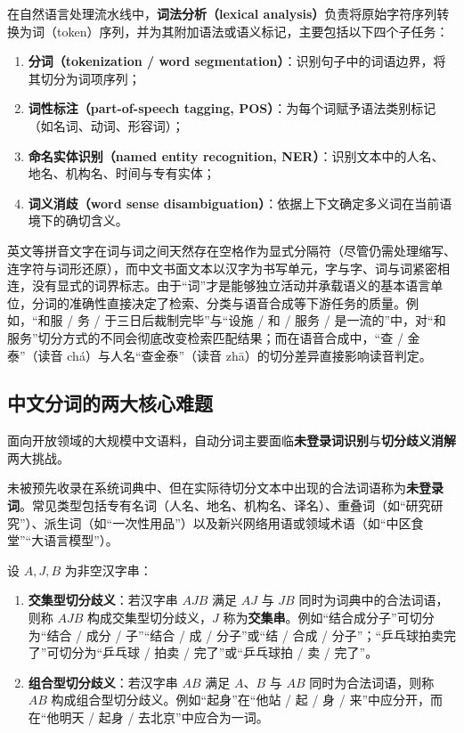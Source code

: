 在自然语言处理流水线中，\textbf{词法分析（lexical analysis）}负责将原始字符序列转换为词（token）序列，并为其附加语法或语义标记，主要包括以下四个子任务：
\begin{enumerate}
  \item \textbf{分词（tokenization / word segmentation）}：识别句子中的词语边界，将其切分为词项序列；
  \item \textbf{词性标注（part-of-speech tagging, POS）}：为每个词赋予语法类别标记（如名词、动词、形容词）；
  \item \textbf{命名实体识别（named entity recognition, NER）}：识别文本中的人名、地名、机构名、时间与专有实体；
  \item \textbf{词义消歧（word sense disambiguation）}：依据上下文确定多义词在当前语境下的确切含义。
\end{enumerate}

英文等拼音文字在词与词之间天然存在空格作为显式分隔符（尽管仍需处理缩写、连字符与词形还原），而中文书面文本以汉字为书写单元，字与字、词与词紧密相连，没有显式的词界标志。由于“词”才是能够独立活动并承载语义的基本语言单位，分词的准确性直接决定了检索、分类与语音合成等下游任务的质量。例如，“和服 / 务 / 于三日后裁制完毕”与“设施 / 和 / 服务 / 是一流的”中，对“和服务”切分方式的不同会彻底改变检索匹配结果；而在语音合成中，“查 / 金泰”（读音 chá）与人名“查金泰”（读音 zhā）的切分差异直接影响读音判定。

\subsection{中文分词的两大核心难题}

面向开放领域的大规模中文语料，自动分词主要面临\textbf{未登录词识别}与\textbf{切分歧义消解}两大挑战。

\begin{definition}\label{def:oov}
未被预先收录在系统词典中、但在实际待切分文本中出现的合法词语称为\textbf{未登录词}。常见类型包括专有名词（人名、地名、机构名、译名）、重叠词（如“研究研究”）、派生词（如“一次性用品”）以及新兴网络用语或领域术语（如“中区食堂”“大语言模型”）。
\end{definition}

\begin{definition}[交集型与组合型切分歧义]\label{def:seg-ambiguity}
设 $A, J, B$ 为非空汉字串：
\begin{enumerate}
  \item \textbf{交集型切分歧义}：若汉字串 $AJB$ 满足 $AJ$ 与 $JB$ 同时为词典中的合法词语，则称 $AJB$ 构成交集型切分歧义，$J$ 称为\textbf{交集串}。例如“结合成分子”可切分为“结合 / 成分 / 子”“结合 / 成 / 分子”或“结 / 合成 / 分子”；“乒乓球拍卖完了”可切分为“乒乓球 / 拍卖 / 完了”或“乒乓球拍 / 卖 / 完了”。
  \item \textbf{组合型切分歧义}：若汉字串 $AB$ 满足 $A$、$B$ 与 $AB$ 同时为合法词语，则称 $AB$ 构成组合型切分歧义。例如“起身”在“他站 / 起 / 身 / 来”中应分开，而在“他明天 / 起身 / 去北京”中应合为一词。
\end{enumerate}
\end{definition}

